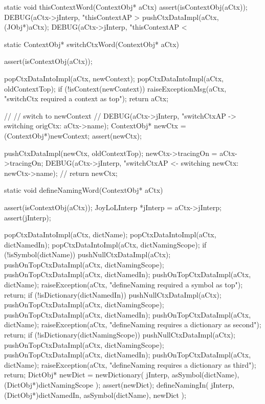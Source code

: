 \startCCode
static void thisContextWord(ContextObj* aCtx) {
  assert(isContextObj(aCtx));
  DEBUG(aCtx->jInterp, "thisContextAP > %
  pushCtxDataImpl(aCtx, (JObj*)aCtx);
  DEBUG(aCtx->jInterp, "thisContextAP < %
}
\stopCCode

\startCCode
static ContextObj* switchCtxWord(ContextObj* aCtx) {
  assert(isContextObj(aCtx));

  popCtxDataIntoImpl(aCtx, newContext);
  popCtxDataIntoImpl(aCtx, oldContextTop);
  if (!isContext(newContext)) {
    raiseExceptionMsg(aCtx,
      "switchCtx required a context as top");
    return aCtx;
  }
  
  //
  // switch to newContext
  //
  DEBUG(aCtx->jInterp, "switchCtxAP -> switching origCtx: %
    aCtx->name);
  ContextObj* newCtx = (ContextObj*)newContext;
  assert(newCtx);

  pushCtxDataImpl(newCtx, oldContextTop);
  newCtx->tracingOn = aCtx->tracingOn;
  DEBUG(aCtx->jInterp, "switchCtxAP <- switching newCtx: %
            newCtx->name);
  //
  return newCtx;
}
\stopCCode

\startCCode
static void defineNamingWord(ContextObj* aCtx) {
  assert(isContextObj(aCtx));
  JoyLoLInterp *jInterp = aCtx->jInterp;
  assert(jInterp);
  
  popCtxDataIntoImpl(aCtx, dictName);
  popCtxDataIntoImpl(aCtx, dictNamedIn);
  popCtxDataIntoImpl(aCtx, dictNamingScope);
  if (!isSymbol(dictName)) {
    pushNullCtxDataImpl(aCtx);
    pushOnTopCtxDataImpl(aCtx, dictNamingScope);
    pushOnTopCtxDataImpl(aCtx, dictNamedIn);
    pushOnTopCtxDataImpl(aCtx, dictName);
    raiseException(aCtx,
      "defineNaming required a symbol as top");
    return;
  }
  if (!isDictionary(dictNamedIn)) {
    pushNullCtxDataImpl(aCtx);
    pushOnTopCtxDataImpl(aCtx, dictNamingScope);
    pushOnTopCtxDataImpl(aCtx, dictNamedIn);
    pushOnTopCtxDataImpl(aCtx, dictName);
    raiseException(aCtx,
      "defineNaming requires a dictionary as second");
    return;
  }
  if (!isDictionary(dictNamingScope)) {
    pushNullCtxDataImpl(aCtx);
    pushOnTopCtxDataImpl(aCtx, dictNamingScope);
    pushOnTopCtxDataImpl(aCtx, dictNamedIn);
    pushOnTopCtxDataImpl(aCtx, dictName);
    raiseException(aCtx,
      "defineNaming requires a dictionary as third");
    return;
  }
  DictObj* newDict =
    newDictionary(
      jInterp,
      asSymbol(dictName),
      (DictObj*)dictNamingScope
    );
  assert(newDict);
  defineNamingIn(
    jInterp,
    (DictObj*)dictNamedIn,
    asSymbol(dictName),
    newDict
  );
}
\stopCCode

